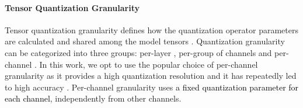 \documentclass[a4paper,conference]{IEEEtran}
\begin{document}
\vspace{-1mm}
\paragraph{Tensor Quantization Granularity}
Tensor quantization granularity defines how the quantization operator parameters are calculated and shared among the model tensors \cite{DBLP:journals/corr/abs-2103-13630}.
Quantization granularity \cite{DBLP:journals/corr/abs-2103-13630} can be categorized into three groups: per-layer \cite{DBLP:journals/corr/abs-1806-08342}, per-group of channels \cite{DBLP:conf/aaai/ShenDYMYGMK20}  and per-channel \cite{DBLP:conf/fpga/0001WDGCLWKW21,DBLP:conf/cvpr/JacobKCZTHAK18,DBLP:journals/corr/abs-1806-08342,DBLP:conf/eccv/ZhangYYH18}. In this work, we opt to use the popular choice of per-channel granularity as it provides a high quantization resolution and it has repeatedly led to high accuracy \cite{DBLP:conf/fpga/0001WDGCLWKW21,DBLP:conf/cvpr/JacobKCZTHAK18,DBLP:journals/corr/abs-1806-08342,DBLP:conf/eccv/ZhangYYH18}.  
Per-channel granularity uses \textcolor{black}{a fixed quantization parameter for each channel}, independently from other channels.
\end{document}
